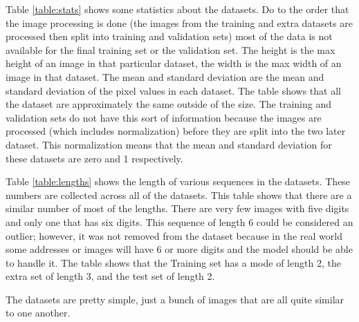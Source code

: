 \documentclass[12pt,twocolumn,letterpaper]{article}
\begin{document}
Table \ref{table:stats} shows some statistics about the datasets. Do to the order that the image
processing is done (the images from the training and extra datasets are 
processed then split into training and validation sets) most of the data is not 
available for the final training set or the validation set. The height is the max 
height of an image in that particular dataset, the width is the max width of an 
image in that dataset. The mean and standard deviation are the mean and standard 
deviation of the pixel values in each dataset. The table shows that all the 
dataset are approximately the same outside of the size. The training and 
validation sets do not have this sort of information because the images are 
processed (which includes normalization) before they are split into the two later 
dataset. This normalization means that the mean and standard deviation for these
datasets are zero and 1 respectively.

Table \ref{table:lengths} shows the length of various sequences in the datasets. These numbers are 
collected across all of the datasets. This table shows that there are a similar 
number of most of the lengths. There are very few images with five digits and 
only one that has six digits. This sequence of length 6 could be considered an 
outlier; however, it was not removed from the dataset because in the real world 
some addresses or images will have 6 or more digits and the model should be 
able to handle it. The table shows that the Training set has a mode of length 2,
the extra set of length 3, and the test set of length 2.

The datasets are pretty simple, just a bunch of images that are all quite similar 
to one another.
\end{document}
